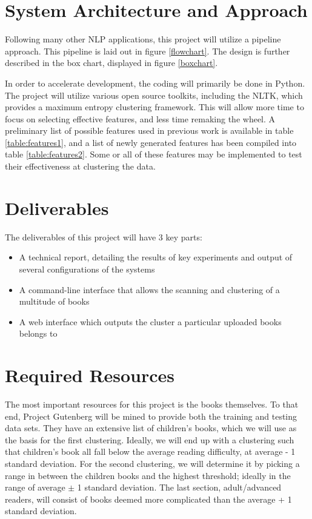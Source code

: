 \documentclass[]{article}
\begin{document}
\section{System Architecture and Approach}

Following many other NLP applications, this project will utilize a pipeline approach.
This pipeline is laid out in figure \ref{flowchart}.
The design is further described in the box chart, displayed in figure \ref{boxchart}.

In order to accelerate development, the coding will primarily be done in Python.
The project will utilize various open source toolkits, including the NLTK, which provides a maximum entropy clustering framework.
This will allow more time to focus on selecting effective features, and less time remaking the wheel.
A preliminary list of possible features used in previous work is available in table \ref{table:features1}, and a list of newly generated features has been compiled into table \ref{table:features2}.
Some or all of these features may be implemented to test their effectiveness at clustering the data.

\section{Deliverables}

The deliverables of this project will have 3 key parts:
\begin{itemize}
	\item A technical report, detailing the results of key experiments and output of several configurations of the systems
	\item A command-line interface that allows the scanning and clustering of a multitude of books
	\item A web interface which outputs the cluster a particular uploaded books belongs to
\end{itemize}

\section{Required Resources}

The most important resources for this project is the books themselves.
To that end, Project Gutenberg will be mined to provide both the training and testing data sets.
They have an extensive list of children's books, which we will use as the basis for the first clustering.
Ideally, we will end up with a clustering such that children's book all fall below the average reading difficulty, at average - 1 standard deviation.
For the second clustering, we will determine it by picking a range in between the children books and the highest threshold; ideally in the range of average $\pm$ 1 standard deviation.
The last section, adult/advanced readers, will consist of books deemed more complicated than the average + 1 standard deviation.
\end{document}
